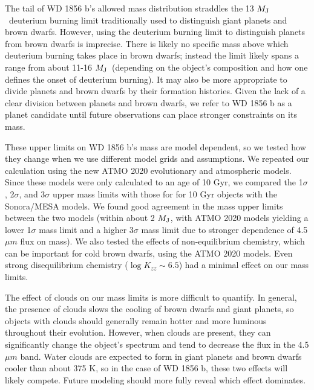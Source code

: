 \documentclass{nature3}
\newcommand*{\bedit}{\textcolor{new_black}}
\newcommand{\mjup}{\ensuremath{M_{\rm J}}}
\begin{document}
\begin{methods}
The tail of WD 1856 b's allowed mass distribution straddles the 13 \mjup\ deuterium burning limit traditionally used to distinguish giant planets and brown dwarfs\cite{boss2007, saumonmarley08,1985Natur.316...42N}. However, using the deuterium burning limit to distinguish planets from brown dwarfs is imprecise. There is likely no specific mass above which deuterium burning takes place in brown dwarfs;\cite{deuterium} instead the limit likely spans a range from about 11-16 \mjup\ (depending on the object's composition and how one defines the onset of deuterium burning). It may also be more appropriate to divide planets and brown dwarfs by their formation histories\cite{chabrier, bowler20}. Given the lack of a clear division between planets and brown dwarfs, we refer to WD 1856 b as a planet candidate until future observations can place stronger constraints on its mass.

\bedit{These upper limits on WD 1856 b's mass are model dependent, so we tested how they change when we use different model grids and assumptions. We repeated our calculation using the new ATMO 2020 evolutionary and atmospheric models\cite{atmomodels}. Since these models were only calculated to an age of 10 Gyr, we compared the 1$\sigma$, 2$\sigma$, and 3$\sigma$ upper mass limits with those for for 10 Gyr objects with the Sonora/MESA models. We found good agreement in the mass upper limits between the two models (within about 2 \mjup, with ATMO 2020 models yielding a lower 1$\sigma$ mass limit and a higher 3$\sigma$ mass limit due to stronger dependence of 4.5 $\mu m$ flux on mass). We also tested the effects of non-equilibrium chemistry, which can be important for cold brown dwarfs\cite{miles20}, using the ATMO 2020 models.  Even strong disequilibrium chemistry ($\log{K_{zz}}\sim 6.5$) had a minimal effect on our mass limits.} 

\bedit{The effect of clouds on our mass limits is more difficult to quantify. In general, the presence of clouds slows the cooling of brown dwarfs and giant planets, so objects with clouds should generally remain hotter and more luminous throughout their evolution\cite{saumonmarley08}. However, when clouds are present, they can significantly change the object's spectrum and tend to decrease the flux in the 4.5 $\mu m$ band\cite{morley2018}. Water clouds are expected to form in giant planets and brown dwarfs cooler than about 375 K\cite{morley2014}, so in the case of WD 1856 b, these two effects will likely compete. Future modeling should more fully reveal which effect dominates.}







\end{methods}
\end{document}
